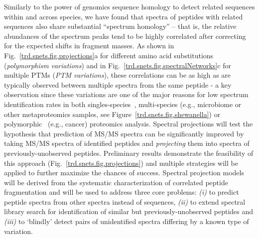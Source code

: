 \documentclass[arial,11pt]{article}
\begin{document}
Similarly to the power of genomics sequence homology to detect related sequences within and across species, we have found that spectra of peptides with related sequences also share substantial ``spectrum homology'' \--- that is, the relative abundances of the spectrum peaks tend to be highly correlated after correcting for the expected shifts in fragment masses. As shown in Fig.~\ref{trd.snets.fig.projections}a for different amino acid substitutions ({\em polymorphism variations}) and in Fig.~\ref{trd.snets.fig.spectralNetworks}c for multiple PTMs ({\em PTM variations}), these correlations can be as high as are typically observed between multiple spectra from the same peptide - a key observation since these variations are one of the major reasons for low spectrum identification rates in both singles-species~\cite{nielsen06,picotti07}, multi-species (e.g., microbiome or other metaproteomics samples, see Figure~\ref{trd.snets.fig.shewanella}) or polymorphic~\cite{shevchenko03,habermann04} (e.g., cancer) proteomics analysis.
%
Spectral projections will test the hypothesis that prediction of MS/MS spectra can be significantly improved by taking MS/MS spectra of identified peptides and {\em projecting} them into spectra of previously-unobserved peptides. Preliminary results demonstrate the feasibility of this approach (Fig.~\ref{trd.snets.fig.projections}) and multiple strategies will be applied to further maximize the chances of success.
%
Spectral projection models will be derived from the systematic characterization of correlated peptide fragmentation and will be used to address three core problems: {\em (i)} to predict peptide spectra from other spectra instead of sequences, {\em (ii)} to extend spectral library search for identification of similar but previously-unobserved peptides and {\em (iii)} to `blindly' detect pairs of unidentified spectra differing by a known type of variation.
\end{document}

